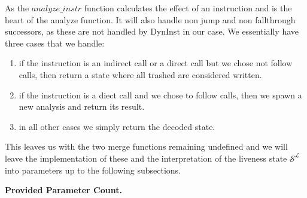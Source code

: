 As the $analyze\_instr$ function calculates the effect of an instruction and is the heart of the analyze function. It will also handle non jump and non fallthrough successors, as these are not handled by DynInst in our case. We essentially have three cases that we handle:
\begin{enumerate}
\item if the instruction is an indirect call or a direct call but we chose not follow calls, then return a state where all trashed are considered written.
\item if the instruction is a diect call and we chose to follow calls, then we spawn a new analysis and return its result.
\item in all other cases we simply return the decoded state.
\end{enumerate}

This leaves us with the two merge functions remaining undefined and we will leave the implementation of these and the interpretation of the liveness state $\mathcal{S}^\mathcal{L}$ into parameters up to the following subsections.

%
%

\textbf{Provided Parameter Count.}
\label{subsection:providedparamcount}


